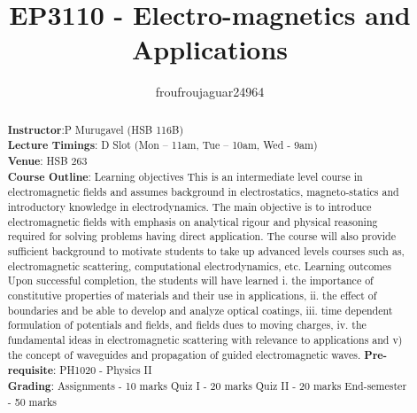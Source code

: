 \documentclass[a4paper]{report}
\author{froufroujaguar24964}
\title{EP3110 - Electro-magnetics and Applications}
\begin{document}
\maketitle

\begin{abstract}
\textbf{Instructor}:P Murugavel (HSB 116B)\\
\textbf{Lecture Timings}: D Slot (Mon – 11am, Tue – 10am, Wed - 9am)\\
\textbf{Venue}: HSB 263\\
\textbf{Course Outline}: Learning objectives This is an intermediate level course in electromagnetic fields and assumes background in electrostatics, magneto-statics and introductory knowledge in electrodynamics. The main objective is to introduce electromagnetic fields with emphasis on analytical rigour and physical reasoning required for solving problems having direct application. The course will also provide sufficient background to motivate students to take up advanced levels courses such as, electromagnetic scattering, computational electrodynamics, etc. Learning outcomes Upon successful completion, the students will have learned i. the importance of constitutive properties of materials and their use in applications, ii. the effect of boundaries and be able to develop and analyze optical coatings, iii. time dependent formulation of potentials and fields, and fields dues to moving charges, iv. the fundamental ideas in electromagnetic scattering with relevance to applications and v) the concept of waveguides and propagation of guided electromagnetic waves.
\textbf{Pre-requisite}: PH1020 - Physics II\\

\textbf{Grading}:
Assignments - 10 marks
Quiz I - 20 marks
Quiz II - 20 marks
End-semester - 50 marks
\end{abstract}

\newpage

\tableofcontents


\newpage
\appendix
\appendixpage



\newpage
\printbibliography
\end{document}
